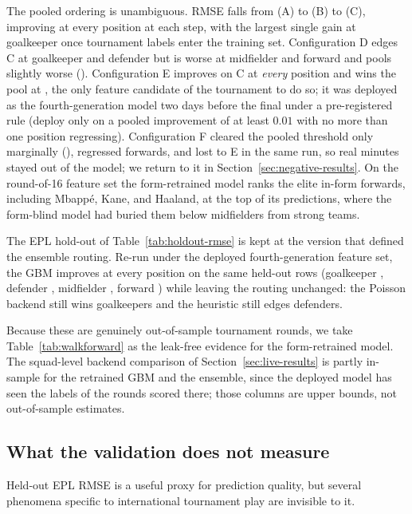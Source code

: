 The pooled ordering is unambiguous. RMSE falls from
\WalkforwardPooledA{} (A) to \WalkforwardPooledB{} (B) to
\WalkforwardPooledC{} (C), improving at every position at each step,
with the largest single gain at goalkeeper once tournament labels
enter the training set. Configuration D edges C at goalkeeper and
defender but is worse at midfielder and forward and pools slightly
worse (\WalkforwardPooledD{}). Configuration E improves on C at
\emph{every} position and wins the pool at \WalkforwardPooledE{},
the only feature candidate of the tournament to do so; it was
deployed as the fourth-generation model two days before the final
under a pre-registered rule (deploy only on a pooled improvement of
at least $0.01$ with no more than one position regressing).
Configuration F cleared the pooled threshold only marginally
(\WalkforwardPooledF{}), regressed forwards, and lost to E in the
same run, so real minutes stayed out of the model; we return to it
in Section~\ref{sec:negative-results}. On the round-of-16 feature
set the form-retrained model ranks the elite in-form forwards,
including Mbapp\'e, Kane, and Haaland, at the top of its
predictions, where the form-blind model had buried them below
midfielders from strong teams.

The EPL hold-out of Table~\ref{tab:holdout-rmse} is kept at the
version that defined the ensemble routing. Re-run under the deployed
fourth-generation feature set, the GBM improves at every position on
the same held-out rows (goalkeeper \RmseGkGbmVFour{}, defender
\RmseDefGbmVFour{}, midfielder \RmseMidGbmVFour{}, forward
\RmseFwdGbmVFour{}) while leaving the routing unchanged: the Poisson
backend still wins goalkeepers and the heuristic still edges
defenders.

Because these are genuinely out-of-sample tournament rounds, we take
Table~\ref{tab:walkforward} as the leak-free evidence for the
form-retrained model. The squad-level backend comparison of
Section~\ref{sec:live-results} is partly in-sample for the retrained
GBM and the ensemble, since the deployed model has seen the labels of
the rounds scored there; those columns are upper bounds, not
out-of-sample estimates.

\subsection{What the validation does not measure}
\label{sec:validation-limits}

Held-out EPL RMSE is a useful proxy for prediction quality, but
several phenomena specific to international tournament play are
invisible to it.

